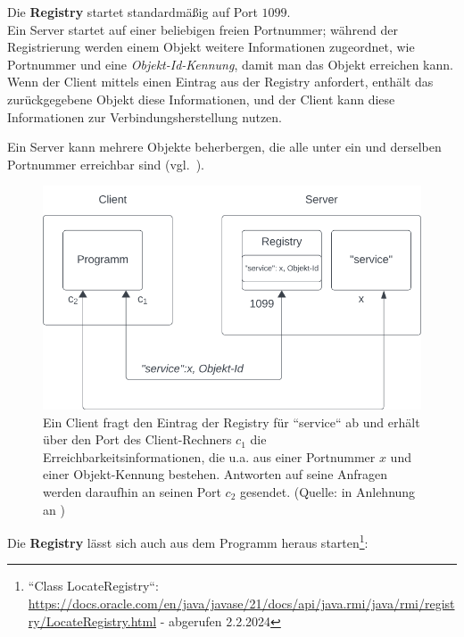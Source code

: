 \noindent
Die \textbf{Registry} startet standardmäßig auf Port $1099$.\\

\noindent
Ein Server startet auf einer beliebigen freien Portnummer; während der Registrierung werden einem Objekt weitere Informationen zugeordnet, wie Portnummer und eine \textit{Objekt-Id-Kennung}, damit man das Objekt erreichen kann.\\
Wenn der Client mittels  einen Eintrag aus der Registry anfordert, enthält das zurückgegebene Objekt diese Informationen, und der Client kann diese Informationen zur Verbindungsherstellung nutzen.\\

\begin{tcolorbox}
    Ein Server kann mehrere Objekte beherbergen, die alle unter ein und derselben Portnummer erreichbar sind (vgl.~\cite[324]{Oec22}).
\end{tcolorbox}

\begin{figure}
    \centering
    \includegraphics[scale=0.5]{chapters/fopt5/img/rmi/registry}
    \caption{Ein Client fragt den Eintrag der Registry für ``service`` ab und erhält über den Port des Client-Rechners $c_1$ die Erreichbarkeitsinformationen, die u.a. aus einer Portnummer $x$ und einer Objekt-Kennung bestehen.
    Antworten auf seine Anfragen werden daraufhin an seinen Port $c_2$ gesendet. (Quelle: in Anlehnung an \cite[324, Bild 6.5]{Oec22})}
    \label{fig:registry}
\end{figure}

Die \textbf{Registry} lässt sich auch aus dem Programm heraus starten\footnote{
``Class LocateRegistry``: \url{https://docs.oracle.com/en/java/javase/21/docs/api/java.rmi/java/rmi/registry/LocateRegistry.html} - abgerufen 2.2.2024
}:

